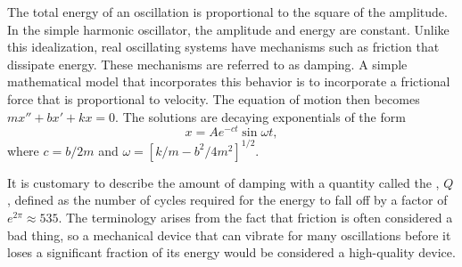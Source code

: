 The total energy of an oscillation is proportional to the square of
the amplitude. In the simple harmonic oscillator, the amplitude and
energy are constant.  Unlike this idealization, real oscillating
systems have mechanisms such as friction that dissipate energy. These mechanisms
are referred to as damping.
A simple mathematical model that incorporates this behavior is
to incorporate a frictional force that is proportional to velocity. The equation of motion
then becomes $mx''+bx'+kx=0$. The solutions are decaying exponentials of the form
\begin{equation*}
  x = A e^{-ct}\sin \omega t,
\end{equation*}
where $c=b/2m$ and $\omega=[k/m-b^2/4m^2]^{1/2}$. 

It is customary to describe the amount of damping with a quantity
called the , $Q$, defined
as the number of cycles required for the energy to fall off by a
factor of $e^{2\pi}\approx 535$. The terminology arises from the fact
that friction is often considered a bad thing, so a mechanical device
that can vibrate for many oscillations before it loses a significant
fraction of its energy would be considered a high-quality device. 
